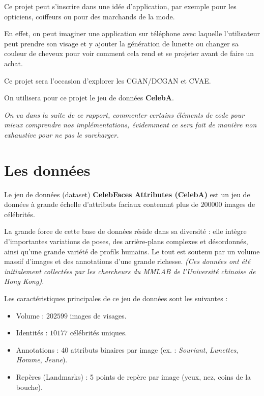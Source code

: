 \documentclass{article}
\begin{document}
Ce projet peut s'inscrire dans une idée d'application, par exemple pour les opticiens, coiffeurs ou pour des marchands de la mode.

En effet, on peut imaginer une application sur téléphone avec laquelle l'utilisateur peut prendre son visage et y ajouter la génération de lunette ou changer sa couleur de cheveux pour voir comment cela rend et se projeter avant de faire un achat.

\medskip

\noindent Ce projet sera l'occasion d'explorer les CGAN/DCGAN et CVAE.

\medskip

\noindent On utilisera pour ce projet le jeu de données \textbf{CelebA}.

\medskip
\medskip
\medskip

\textit{On va dans la suite de ce rapport, commenter certains éléments de code pour mieux comprendre nos implémentations, évidemment ce sera fait de manière non exhaustive pour ne pas le surcharger.}




\newpage
\section{Les données}

Le jeu de données (dataset) \textbf{CelebFaces Attributes (CelebA)} est un jeu de données à grande échelle d'attributs faciaux contenant plus de $200 000$ images de célébrités.

La grande force de cette base de données réside dans sa diversité : elle intègre d'importantes variations de poses, des arrière-plans complexes et désordonnés, ainsi qu'une grande variété de profils humains. Le tout est soutenu par un volume massif d'images et des annotations d'une grande richesse. \textit{(Ces données ont été initialement collectées par les chercheurs du MMLAB de l'Université chinoise de Hong Kong).}

\medskip

\noindent Les caractéristiques principales de ce jeu de données sont les suivantes :
\begin{itemize}
    \item Volume : $202 599$ images de visages.
    \item Identités : $10 177$ célébrités uniques.
    \item Annotations : $40$ attributs binaires par image (ex. : \textit{Souriant}, \textit{Lunettes}, \textit{Homme}, \textit{Jeune}).
    \item Repères (Landmarks) : 5 points de repère par image (yeux, nez, coins de la bouche).
\end{itemize}
\end{document}
